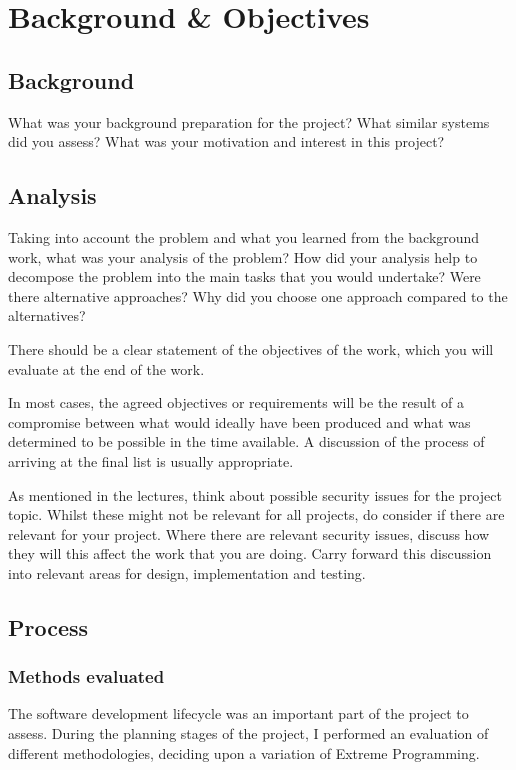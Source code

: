 \chapter{Background \& Objectives}

\section{Background}
What was your background preparation for the project? What similar systems did you assess? What was your motivation and interest in this project?

\section{Analysis}
Taking into account the problem and what you learned from the background work, what was your analysis of the problem? How did your analysis help to decompose the problem into the main tasks that you would undertake? Were there alternative approaches? Why did you choose one approach compared to the alternatives? 

There should be a clear statement of the objectives of the work, which you will evaluate at the end of the work. 

In most cases, the agreed objectives or requirements will be the result of a compromise between what would ideally have been produced and what was determined to be possible in the time available. A discussion of the process of arriving at the final list is usually appropriate.

As mentioned in the lectures, think about possible security issues for the project topic. Whilst these might not be relevant for all projects, do consider if there are relevant for your project. Where there are relevant security issues, discuss how they will this affect the work that you are doing. Carry forward this discussion into relevant areas for design, implementation and testing.

\section{Process}

\subsection{Methods evaluated}

The software development lifecycle was an important part of the project to assess. During the planning stages of the project, I performed an evaluation of different methodologies, deciding upon a variation of Extreme Programming. 

